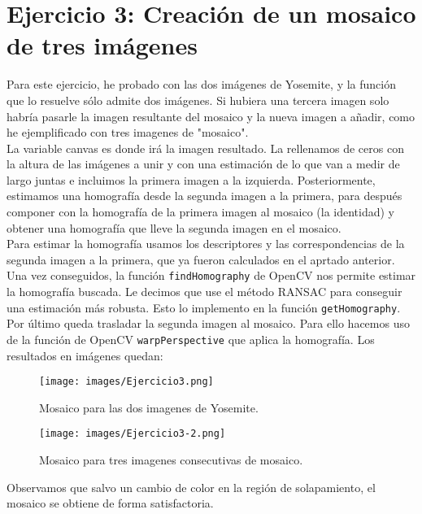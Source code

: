 \documentclass[12pt]{article}
\begin{document}
\section*{Ejercicio 3: Creación de un mosaico de tres imágenes}
Para este ejercicio, he probado con las dos imágenes de Yosemite, y la función que lo resuelve sólo admite dos imágenes. Si hubiera una tercera imagen solo habría pasarle la imagen resultante del mosaico y la nueva imagen a añadir, como he ejemplificado con tres imagenes de "mosaico".\\
La variable canvas es donde irá la imagen resultado. La rellenamos de ceros con la altura de las imágenes a unir y con una estimación de lo que van a medir de largo juntas e incluimos la primera imagen a la izquierda. Posteriormente, estimamos una homografía desde la segunda imagen a la primera, para después componer con la homografía de la primera imagen al mosaico (la identidad) y obtener una homografía que lleve la segunda imagen en el mosaico.\\
Para estimar la homografía usamos los descriptores y las correspondencias de la segunda imagen a la primera, que ya fueron calculados en el aprtado anterior. Una vez conseguidos, la función \texttt{findHomography} de OpenCV nos permite estimar la homografía buscada. Le decimos que use el método RANSAC para conseguir una estimación más robusta. Esto lo implemento en la función \texttt{getHomography}.\\
Por último queda trasladar la segunda imagen al mosaico. Para ello hacemos uso de la función de OpenCV \texttt{warpPerspective} que aplica la homografía. Los resultados en imágenes quedan:
\begin{figure}[H]
\centering
\texttt{[image: images/Ejercicio3.png]} 
\caption{Mosaico para las dos imagenes de Yosemite.}
\label{etiqueta}
\end{figure}
\begin{figure}[H]
\centering
\texttt{[image: images/Ejercicio3-2.png]} 
\caption{Mosaico para tres imagenes consecutivas de mosaico.}
\label{etiqueta}
\end{figure}
Observamos que salvo un cambio de color en la región de solapamiento, el mosaico se obtiene de forma satisfactoria.
\end{document}

